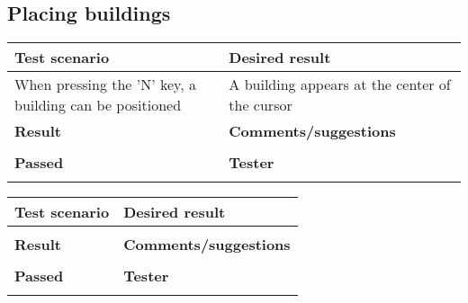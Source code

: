 \subsection{Placing buildings}

\begin{tabularx}{\textwidth}{|X|X|}
\hline
\textbf{Test scenario}   & \textbf{Desired result}       \\ \hline
When pressing the 'N' key, a building can be positioned  &
A building appears at the center of the cursor                               \\ \hline
\textbf{Result}          & \textbf{Comments/suggestions} \\ \hline
                         &                               \\ \hline
\textbf{Passed}          & \textbf{Tester}               \\ \hline
\cellcolor{green} &                               		 \\ \hline
\end{tabularx}

\begin{tabularx}{\textwidth}{|X|X|}
\hline
\textbf{Test scenario}   & \textbf{Desired result}       \\ \hline
                         &                               \\ \hline
\textbf{Result}          & \textbf{Comments/suggestions} \\ \hline
                         &                               \\ \hline
\textbf{Passed}          & \textbf{Tester}               \\ \hline
\cellcolor{red} &                               		 \\ \hline
\end{tabularx}